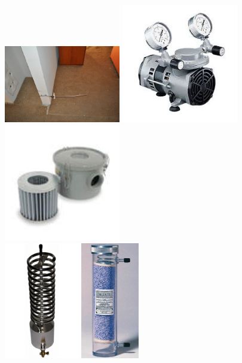 \documentclass[12pt,oneside]{book}
\begin{document}
\begin{figure}[H]
	\centering
	\includegraphics[width = 2in]{0_Images/Instrumentation/Gas_Analyzer/SamplePoint.jpg}
	\includegraphics[width = 2in]{0_Images/Instrumentation/Gas_Analyzer/VaccumPump.jpg}
	\includegraphics[width = 2in]{0_Images/Instrumentation/Gas_Analyzer/CourseFilter.jpg} \\
	\includegraphics[height = 2in]{0_Images/Instrumentation/Gas_Analyzer/CoilCondenser.png} \hspace{0.1\textwidth}
	\includegraphics[height = 2in]{0_Images/Instrumentation/Gas_Analyzer/DriRightTube.jpg}	\hspace{0.1\textwidth}

\end{figure}
\end{document}
